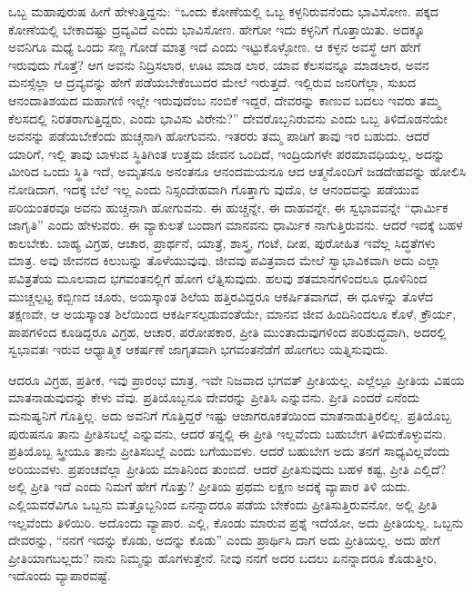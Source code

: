 ಒಬ್ಬ ಮಹಾಪುರುಷ ಹೀಗೆ ಹೇಳುತ್ತಿದ್ದನು: “ಒಂದು ಕೋಣೆಯಲ್ಲಿ ಒಬ್ಬ ಕಳ್ಳನಿರುವನೆಂದು ಭಾವಿಸೋಣ. ಪಕ್ಕದ ಕೋಣೆಯಲ್ಲಿ ಬೇಕಾದಷ್ಟು ದ್ರವ್ಯವಿದೆ ಎಂದು ಭಾವಿಸೋಣ. ಹೇಗೋ ಇದು ಕಳ್ಳನಿಗೆ ಗೊತ್ತಾಯಿತು. ಅದಕ್ಕೂ ಅವನಿಗೂ ಮಧ್ಯೆ ಒಂದು ಸಣ್ಣ ಗೋಡೆ ಮಾತ್ರ ಇದೆ ಎಂದು ಇಟ್ಟುಕೊಳ್ಳೋಣ. ಆ ಕಳ್ಳನ ಅವಸ್ಥೆ ಆಗ ಹೇಗೆ ಇರುವುದು ಗೊತ್ತೆ? ಆಗ ಅವನು ನಿದ್ರಿಸಲಾರ, ಊಟ ಮಾಡ ಲಾರ, ಯಾವ ಕೆಲಸವನ್ನೂ ಮಾಡಲಾರ, ಅವನ ಮನಸ್ಸೆಲ್ಲಾ ಆ ದ್ರವ್ಯವನ್ನು ಹೇಗೆ ಪಡೆಯಬೇಕೆಂಬುದರ ಮೇಲೆ ಇರುತ್ತದೆ. ಇಲ್ಲಿರುವ ಜನರಿಗೆಲ್ಲಾ, ಸುಖದ ಆನಂದಾತಿಶಯದ ಮಹಾಗಣಿ ಇಲ್ಲೇ ಇರುವುದೆಂಬ ನಂಬಿಕೆ ಇದ್ದರೆ, ದೇವರನ್ನು ಕಾಣುವ ಬದಲು ಇವರು ತಮ್ಮ ಕೆಲಸದಲ್ಲಿ ನಿರತರಾಗುತ್ತಿದ್ದರು, ಎಂದು ಭಾವಿಸು ವಿರೇನು?” ದೇವರೊಬ್ಬನಿರುವನು ಎಂದು ಒಬ್ಬ ತಿಳಿದೊಡನೆಯೇ ಅವನನ್ನು ಪಡೆಯಬೇಕೆಂದು ಹುಚ್ಚನಾಗಿ ಹೋಗುವನು. ಇತರರು ತಮ್ಮ ಪಾಡಿಗೆ ತಾವು ಇರ ಬಹುದು. ಆದರೆ ಯಾರಿಗೆ, ಇಲ್ಲಿ ತಾವು ಬಾಳುವ ಸ್ಥಿತಿಗಿಂತ ಉತ್ತಮ ಜೀವನ ಒಂದಿದೆ, ಇಂದ್ರಿಯಗಳೇ ಪರಮಾವಧಿಯಲ್ಲ, ಅದನ್ನು ಮೀರಿದ ಒಂದು ಸ್ಥಿತಿ ಇದೆ, ಅಮೃತನೂ ಅನಂತನೂ ಆನಂದಮಯನೂ ಆದ ಆತ್ಮನೊಂದಿಗೆ ಜಡದೇಹವನ್ನು ಹೋಲಿಸಿ ನೋಡಿದಾಗ, ಇದಕ್ಕೆ ಬೆಲೆ ಇಲ್ಲ ಎಂದು ನಿಸ್ಸಂದೇಹವಾಗಿ ಗೊತ್ತಾಗು ವುದೊ, ಆ ಆನಂದವನ್ನು ಪಡೆಯುವ ಪರಿಯಂತರವೂ ಅವನು ಹುಚ್ಚನಾಗಿ ಹೋಗುವನು. ಈ ಹುಚ್ಚನ್ನೇ, ಈ ದಾಹವನ್ನೇ, ಈ ಸ್ವಭಾವವನ್ನೇ “ಧಾರ್ಮಿಕ ಜಾಗೃತಿ” ಎಂದು ಹೇಳುವರು. ಈ ವ್ಯಾಕುಲತೆ ಬಂದಾಗ ಮಾನವನು ಧಾರ್ಮಿಕ ನಾಗುತ್ತಿರುವನು. ಆದರೆ ಇದಕ್ಕೆ ಬಹಳ ಕಾಲಬೇಕು. ಬಾಹ್ಯ ವಿಗ್ರಹ, ಆಚಾರ, ಪ್ರಾರ್ಥನೆ, ಯಾತ್ರೆ, ಶಾಸ್ತ್ರ, ಗಂಟೆ, ದೀಪ, ಪುರೋಹಿತ ಇವೆಲ್ಲ ಸಿದ್ಧತೆಗಳು ಮಾತ್ರ. ಅವು ಜೀವನದ ಕಿಲುಬನ್ನು ತೊಳೆಯುವುವು. ಜೀವವು ಪವಿತ್ರವಾದ ಮೇಲೆ ಸ್ವಾಭಾವಿಕವಾಗಿ ಅದು ಎಲ್ಲಾ ಪವಿತ್ರತೆಯ ಮೂಲವಾದ ಭಗವಂತನಲ್ಲಿಗೆ ಹೋಗ ಲೆತ್ನಿಸುವುದು. ಹಲವು ಶತಮಾನಗಳಿಂದಲೂ ಧೂಳಿನಿಂದ ಮುಚ್ಚಲ್ಪಟ್ಟ ಕಬ್ಬಿಣದ ಚೂರು, ಅಯಸ್ಕಾಂತ ಶಿಲೆಯ ಹತ್ತಿರವಿದ್ದರೂ ಆಕರ್ಷಿತವಾಗದೆ, ಈ ಧೂಳನ್ನು ತೊಳೆದ ತಕ್ಷಣವೇ, ಆ ಅಯಸ್ಕಾಂತ ಶಿಲೆಯಿಂದ ಆಕರ್ಷಿಸಲ್ಪಡುವಂತೆಯೇ, ಮಾನವ ಜೀವ ಹಿಂದಿನಿಂದಲೂ ಕೊಳೆ, ಕ್ರೌರ್ಯ, ಪಾಪಗಳಿಂದ ಕೂಡಿದ್ದರೂ ವಿಗ್ರಹ, ಆಚಾರ, ಪರೋಪಕಾರ, ಪ್ರೀತಿ ಮುಂತಾದುವುಗಳಿಂದ ಪರಿಶುದ್ಧವಾಗಿ, ಅದರಲ್ಲಿ ಸ್ವಭಾವತಃ ಇರುವ ಆಧ್ಯಾತ್ಮಿಕ ಆಕರ್ಷಣೆ ಜಾಗೃತವಾಗಿ ಭಗವಂತನೆಡೆಗೆ ಹೋಗಲು ಯತ್ನಿಸುವುದು.

ಆದರೂ ವಿಗ್ರಹ, ಪ್ರತೀಕ, ಇವು ಪ್ರಾರಂಭ ಮಾತ್ರ, ಇವೇ ನಿಜವಾದ ಭಗವತ್​ ಪ್ರೀತಿಯಲ್ಲ. ಎಲ್ಲೆಲ್ಲೂ ಪ್ರೀತಿಯ ವಿಷಯ ಮಾತನಾಡುವುದನ್ನು ಕೇಳು ವೆವು. ಪ್ರತಿಯೊಬ್ಬನೂ ದೇವರನ್ನು ಪ್ರೀತಿಸಿ ಎನ್ನುವನು. ಪ್ರೀತಿ ಎಂದರೆ ಏನೆಂದು ಮನುಷ್ಯನಿಗೆ ಗೊತ್ತಿಲ್ಲ. ಅದು ಅವನಿಗೆ ಗೊತ್ತಿದ್ದರೆ ಇಷ್ಟು ಆಜಾಗರೂಕತೆಯಿಂದ ಮಾತನಾಡುತ್ತಿರಲಿಲ್ಲ. ಪ್ರತಿಯೊಬ್ಬ ಪುರುಷನೂ ತಾನು ಪ್ರೀತಿಸಬಲ್ಲೆ ಎನ್ನುವನು, ಆದರೆ ತನ್ನಲ್ಲಿ ಈ ಪ್ರೀತಿ ಇಲ್ಲವೆಂದು ಬಹುಬೇಗ ತಿಳಿದುಕೊಳ್ಳುವನು. ಪ್ರತಿಯೊಬ್ಬ ಸ್ತ್ರೀಯೂ ತಾನು ಪ್ರೀತಿಸಬಲ್ಲೆ ಎಂದು ಬಗೆಯುವಳು. ಆದರೆ ಬಹುಬೇಗ ಅದು ತನಗೆ ಸಾಧ್ಯವಿಲ್ಲವೆಂದು ಅರಿಯುವಳು. ಪ್ರಪಂಚವೆಲ್ಲಾ ಪ್ರೀತಿಯ ಮಾತಿನಿಂದ ತುಂಬಿದೆ. ಆದರೆ ಪ್ರೀತಿಸುವುದು ಬಹಳ ಕಷ್ಟ, ಪ್ರೀತಿ ಎಲ್ಲಿದೆ? ಅಲ್ಲಿ ಪ್ರೀತಿ ಇದೆ ಎಂದು ನಿಮಗೆ ಹೇಗೆ ಗೊತ್ತು? ಪ್ರೀತಿಯ ಪ್ರಥಮ ಲಕ್ಷಣ ಅದಕ್ಕೆ ವ್ಯಾಪಾರ ತಿಳಿ ಯದು. ಎಲ್ಲಿಯವರೆವಿಗೂ ಒಬ್ಬನು ಮತ್ತೊಬ್ಬನಿಂದ ಏನನ್ನಾದರೂ ಪಡೆಯ ಬೇಕೆಂದು ಪ್ರೀತಿಸುತ್ತಿರುವನೋ, ಅಲ್ಲಿ ಪ್ರೀತಿ ಇಲ್ಲವೆಂದು ತಿಳಿಯಿರಿ. ಅದೊಂದು ವ್ಯಾಪಾರ. ಎಲ್ಲಿ, ಕೊಂಡು ಮಾರುವ ಪ್ರಶ್ನೆ ಇದೆಯೋ, ಅದು ಪ್ರೀತಿಯಲ್ಲ. ಒಬ್ಬನು ದೇವರನ್ನು, “ನನಗೆ ಇದನ್ನು ಕೊಡು, ಅದನ್ನು ಕೊಡು” ಎಂದು ಪ್ರಾರ್ಥಿಸಿ ದಾಗ ಅದು ಪ್ರೀತಿಯಲ್ಲ. ಅದು ಹೇಗೆ ಪ್ರೀತಿಯಾಗಬಲ್ಲದು? ನಾನು ನಿಮ್ಮನ್ನು ಹೊಗಳುತ್ತೇನೆ. ನೀವು ನನಗೆ ಅದರ ಬದಲು ಏನನ್ನಾದರೂ ಕೊಡುತ್ತೀರಿ, ಇದೊಂದು ವ್ಯಾಪಾರವಷ್ಟೆ.

